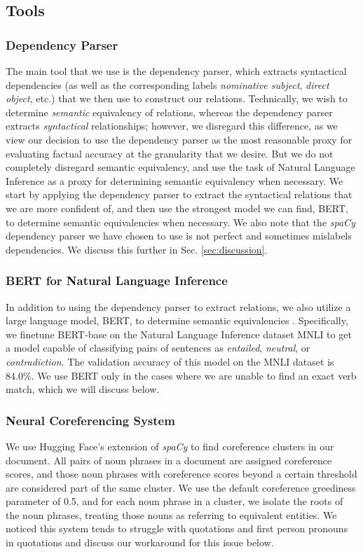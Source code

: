 \documentclass{article}
\begin{document}
\subsection{Tools}

\subsubsection{Dependency Parser}

The main tool that we use is the dependency parser, which extracts syntactical dependencies (as well as the corresponding labels \textit{nominative subject}, \textit{direct object}, etc.) that we then use to construct our relations. Technically, we wish to determine \textit{semantic} equivalency of relations, whereas the dependency parser extracts \textit{syntactical} relationships; however, we disregard this difference, as we view our decision to use the dependency parser as the most reasonable proxy for evaluating factual accuracy at the granularity that we desire. But we do not completely disregard semantic equivalency, and use the task of Natural Language Inference as a proxy for determining semantic equivalency when necessary. We start by applying the dependency parser to extract the syntactical relations that we are more confident of, and then use the strongest model we can find, BERT, to determine semantic equivalencies when necessary. We also note that the \textit{spaCy} dependency parser we have chosen to use is not perfect and sometimes mislabels dependencies. We discuss this further in Sec. \ref{sec:discussion}.

\subsubsection{BERT for Natural Language Inference}
In addition to using the dependency parser to extract relations, we also utilize a large language model, BERT, to determine semantic equivalencies \cite{devlin2018bert}. Specifically, we finetune  BERT-base on the Natural Language Inference dataset MNLI to get a model capable of classifying pairs of sentences as \textit{entailed}, \textit{neutral}, or \textit{contradiction}. The validation accuracy of this model on the MNLI dataset is $84.0\%$. We use BERT only in the cases where we are unable to find an exact verb match, which we will discuss below.

\subsubsection{Neural Coreferencing System}
We use Hugging Face's extension of \textit{spaCy} to find coreference clusters in our document. All pairs of noun phrases in a document are assigned coreference scores, and those noun phrases with coreference scores beyond a certain threshold are considered part of the same cluster. We use the default coreference greediness parameter of 0.5, and for each noun phrase in a cluster, we isolate the roots of the noun phrases, treating those nouns as referring to equivalent entities. We noticed this system tends to struggle with quotations and first person pronouns in quotations and discuss our workaround for this issue below.
\end{document}
